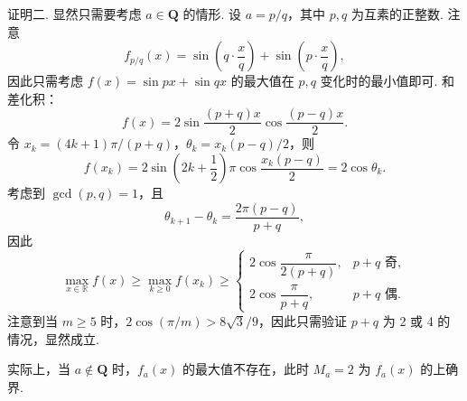 \begin{solutions}
证明二. 显然只需要考虑 $a\in \mathbf{Q}$ 的情形. 设 $a=p/q$，其中 $p,q$ 为互素的正整数. 注意
$$
f_{p/q}(x)=\sin(q\cdot \frac{x}{q})+\sin(p\cdot \frac{x}{q}),
$$
因此只需考虑 $f(x)=\sin px+\sin qx$ 的最大值在 $p,q$ 变化时的最小值即可. 和差化积：
$$
f(x)=2\sin \frac{(p+q)x}{2}\cos \frac{(p-q)x}{2}.
$$
令 $x_k=(4k+1)\pi/(p+q)$，$\theta_k=x_k(p-q)/2$，则
$$
f(x_k)=2\sin(2k+\frac{1}{2})\pi \cos \frac{x_k(p-q)}{2}=2\cos \theta_k.
$$
考虑到 $\gcd(p,q)=1$，且
$$
\theta_{k+1}-\theta_k=\frac{2\pi(p-q)}{p+q},
$$
因此
$$
\max_{x\in \mathbb{R}} f(x) \geqslant \max_{k \geqslant 0} f(x_k) \geqslant \begin{cases} 2\cos \dfrac{\pi}{2(p+q)}, & p+q \text{ 奇}, \\ 2\cos \dfrac{\pi}{p+q}, & p+q \text{ 偶}. \end{cases}
$$
注意到当 $m \geqslant 5$ 时，$2\cos(\pi/m) > 8\sqrt{3}/9$，因此只需验证 $p+q$ 为 2 或 4 的情况，显然成立.
\end{solutions}

\begin{remark}
实际上，当 $a \notin \mathbf{Q}$ 时，$f_a(x)$ 的最大值不存在，此时 $M_a=2$ 为 $f_a(x)$ 的上确界.
\end{remark}